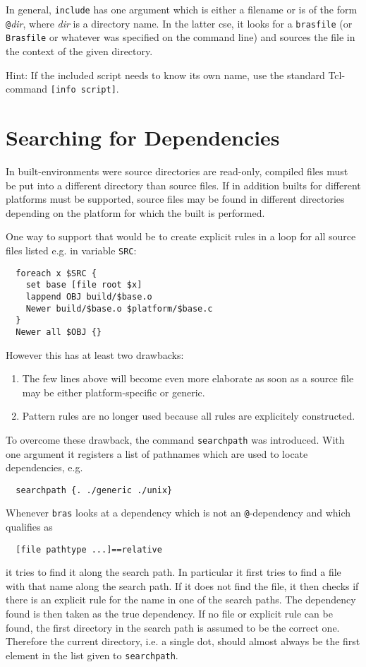 \documentclass[12pt]{article}
\newcommand{\bras}{\texttt{bras}}
\newcommand{\brasfile}{\texttt{brasfile}}
\newcommand{\Brasfile}{\texttt{Brasfile}}
\begin{document}
In general, \texttt{include} has one argument which is either a
filename or is of the form \texttt{@}\textit{dir}, where \textit{dir}
is a directory name. In the latter cse, it looks for a \brasfile{} (or
\Brasfile{} or whatever was specified on the command line) and sources
the file in the context of the given directory.

Hint: If the included script needs to know its own name, use the
standard Tcl-command \texttt{[info script]}.
\section{Searching for Dependencies}
\label{secSearchPath}

In built-environments were source directories are read-only, compiled
files must be put into a different directory than source files. If in
addition builts for different platforms must be supported, source
files may be found in different directories depending on the platform
for which the built is performed.

One way to support that would be to create explicit rules in a loop
for all source files listed e.g. in variable \texttt{SRC}:
\begin{verbatim}
  foreach x $SRC {
    set base [file root $x]
    lappend OBJ build/$base.o
    Newer build/$base.o $platform/$base.c
  }
  Newer all $OBJ {}
\end{verbatim}

However this has at least two drawbacks:
\begin{enumerate}
\item The few lines above will become even more elaborate as soon as a
  source file may be either platform-specific or generic.
\item Pattern rules are no longer used because all rules are
  explicitely constructed.
\end{enumerate}

To overcome these drawback, the command \texttt{searchpath} was
introduced. With one argument it registers a list of pathnames which are
used to locate dependencies, e.g.
\begin{verbatim}
  searchpath {. ./generic ./unix}
\end{verbatim}
Whenever \bras{} looks at a dependency which is not an
\texttt{@}-dependency and which qualifies as
\begin{verbatim}
  [file pathtype ...]==relative
\end{verbatim}
it tries to find it along the search path. In particular it first
tries to find a file with that name along the search path. If it does
not find the file, it then
checks if there is an explicit rule for the name in one of the search
paths. The dependency found is then taken as the true dependency. If
no file or explicit rule can be found, the first directory in the
search path is assumed to be the correct one. Therefore the current
directory, i.e. a single dot, should almost always be the first
element in the list given to \texttt{searchpath}.
\end{document}
